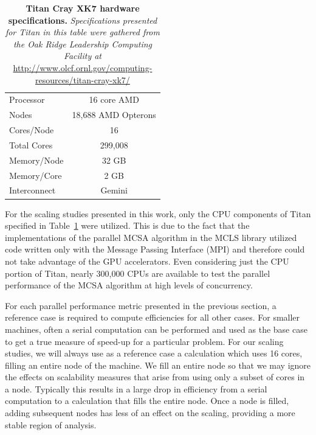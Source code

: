 \begin{table}[h!]
  \begin{center}
    \begin{tabular}{lc}\hline\hline
      Processor & 16 core AMD \\
      Nodes & 18,688 AMD Opterons \\
      Cores/Node & 16 \\
      Total Cores & 299,008 \\
      Memory/Node & 32 GB \\
      Memory/Core & 2 GB \\
      Interconnect & Gemini \\
      \hline\hline
    \end{tabular}
  \end{center}
  \caption{\textbf{Titan Cray XK7 hardware specifications.}
    \textit{Specifications presented for Titan in this table were
      gathered from the Oak Ridge Leadership Computing Facility at}
    \url{http://www.olcf.ornl.gov/computing-resources/titan-cray-xk7/}}
  \label{tab:titan_hardware}
\end{table}

For the scaling studies presented in this work, only the CPU
components of Titan specified in Table~\ref{tab:titan_hardware} were
utilized. This is due to the fact that the implementations of the
parallel MCSA algorithm in the MCLS library utilized code written only
with the Message Passing Interface (MPI) and therefore could not take
advantage of the GPU accelerators. Even considering just the CPU
portion of Titan, nearly 300,000 CPUs are available to test the
parallel performance of the MCSA algorithm at high levels of
concurrency.

For each parallel performance metric presented in the previous
section, a reference case is required to compute efficiencies for all
other cases. For smaller machines, often a serial computation can be
performed and used as the base case to get a true measure of speed-up
for a particular problem. For our scaling studies, we will always use
as a reference case a calculation which uses 16 cores, filling an
entire node of the machine. We fill an entire node so that we may
ignore the effects on scalability measures that arise from using only
a subset of cores in a node. Typically this results in a large drop in
efficiency from a serial computation to a calculation that fills the
entire node. Once a node is filled, adding subsequent nodes has less
of an effect on the scaling, providing a more stable region of
analysis.

